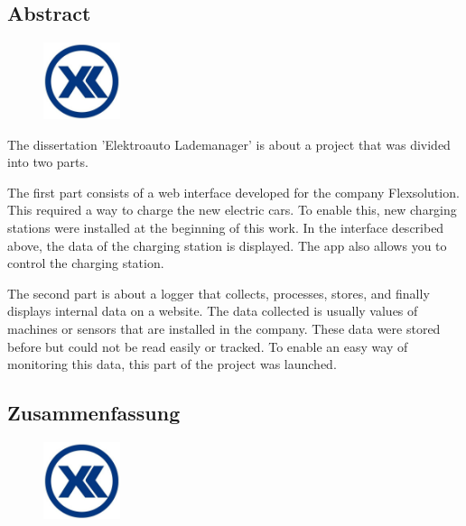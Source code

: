 \begin{spacing}{1}
    \chapter*{Abstract}
\end{spacing}
\begin{figure}
    \begin{center}
      \includegraphics[width=0.2\textwidth]{pics/Firmenlogo.jpeg}
    \end{center}
\end{figure}
The dissertation 'Elektroauto Lademanager' is about a project that was divided into two parts.

The first part consists of a web interface developed for the company Flexsolution. This required a way to charge the new electric cars. To enable this, new charging stations were installed at the beginning of this work. In the interface described above, the data of the charging station is displayed. The app also allows you to control the charging station.


The second part is about a logger that collects, processes, stores, and finally displays internal data on a website. The data collected is usually values of machines or sensors that are installed in the company. These data were stored before but could not be read easily or tracked. To enable an easy way of monitoring this data, this part of the project was launched.
\newpage
\begin{spacing}{1}
    \chapter*{Zusammenfassung}
\end{spacing}
\begin{figure}
    \begin{center}
      \includegraphics[width=0.2\textwidth]{pics/Firmenlogo.jpeg}
    \end{center}
\end{figure}


